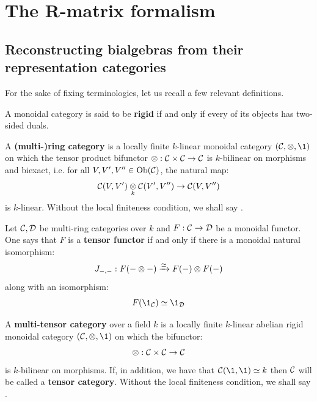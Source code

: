 \section{The R-matrix formalism}
    \subsection{Reconstructing bialgebras from their representation categories}
        For the sake of fixing terminologies, let us recall a few relevant definitions.
        \begin{definition} \label{def: rigid_monoidal_categories}
            A monoidal category is said to be \textbf{rigid} if and only if every of its objects has two-sided duals. 
        \end{definition}
        \begin{definition} \label{def: ring_categories}
            \cite[Definition 4.1.1]{EGNO} A \textbf{(multi-)ring category} is a locally finite $k$-linear monoidal category $(\C, \tensor, \1)$ on which the tensor product bifunctor $\tensor: \C \x \C \to \C$ is $k$-bilinear on morphisms and biexact, i.e. for all $V, V', V'' \in \mathrm{Ob}(\mathcal{C})$, the natural map:
                $$\C(V, V') \tensor_k \C(V', V'') \to \C(V, V'')$$
            is $k$-linear. Without the local finiteness condition, we shall say .
        \end{definition}
        \begin{definition} \label{def: tensor_functors}
            Let $\mathcal{C}, \mathcal{D}$ be multi-ring categories over $k$ and $F: \mathcal{C} \to \mathcal{D}$ be a monoidal functor. One says that $F$ is a \textbf{tensor functor} if and only if there is a monoidal natural isomorphism:
                $$J_{-, -}: F(- \tensor -) \xrightarrow[]{\cong} F(-) \tensor F(-)$$
            along with an isomorphism:
                $$F(\1_{\C}) \cong \1_{\D}$$
        \end{definition}
        \begin{definition} \label{def: tensor_categories}
            \cite[Definition 4.1.1]{EGNO} A  \textbf{multi-tensor category} over a field $k$ is a locally finite $k$-linear abelian rigid monoidal category $(\C, \tensor, \1)$ on which the bifunctor:
                $$\tensor: \C \x \C \to \C$$
            is $k$-bilinear on morphisms. If, in addition, we have that $\C(\1, \1) \cong k$ then $\mathcal{C}$ will be called a \textbf{tensor category}. Without the local finiteness condition, we shall say .
        \end{definition}
